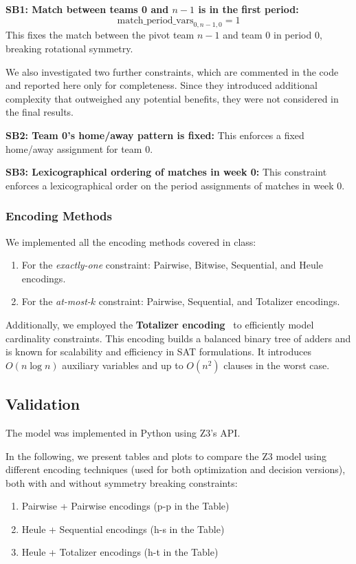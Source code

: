 \textbf{SB1: Match between teams 0 and $n-1$ is in the first period:}
\[
\text{match\_period\_vars}_{0,n-1,0} = 1
\]
This fixes the match between the pivot team $n-1$ and team 0 in period 0, breaking rotational symmetry.

We also investigated two further constraints, which are commented in the code and reported here only for completeness. Since they introduced additional complexity that outweighed any potential benefits, they were not considered in the final results.

\textbf{SB2: Team 0's home/away pattern is fixed:} This enforces a fixed home/away assignment for team 0.

\textbf{SB3: Lexicographical ordering of matches in week 0:} This constraint enforces a lexicographical order on the period assignments of matches in week 0.


\subsubsection*{Encoding Methods}
We implemented all the encoding methods covered in class:

\begin{enumerate}
    \item For the \textit{exactly-one} constraint: Pairwise, Bitwise, Sequential, and Heule encodings.
    \item For the \textit{at-most-$k$} constraint: Pairwise, Sequential, and Totalizer encodings.
\end{enumerate}

Additionally, we employed the \textbf{Totalizer encoding}~\cite{bailleux2003} to efficiently model cardinality constraints. This encoding builds a balanced binary tree of adders and is known for scalability and efficiency in SAT formulations. It introduces $O(n \log n)$ auxiliary variables and up to $O(n^2)$ clauses in the worst case.

\subsection{Validation}
\label{validation}
The model was implemented in Python using Z3's API. 


In the following, we present tables and plots to compare the Z3 model using different encoding techniques (used for both optimization and decision versions), both with and without symmetry breaking constraints:

\begin{enumerate}
\item Pairwise + Pairwise encodings  (p-p in the Table)
\item Heule + Sequential encodings   (h-s in the Table)
\item Heule + Totalizer encodings    (h-t in the Table)
\end{enumerate}


